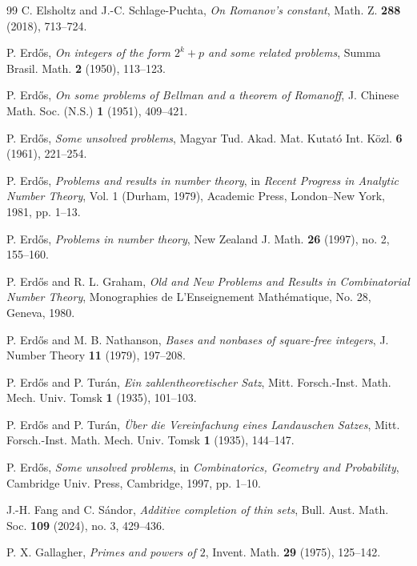 \documentclass[11pt,reqno]{amsart}
\numberwithin{equation}{section}
\begin{document}
\begin{thebibliography}{99}
    C. Elsholtz and J.-C. Schlage-Puchta, \emph{On Romanov's constant}, Math. Z. \textbf{288} (2018), 713--724.

    P. Erd\H{o}s, \emph{On integers of the form $2^k+p$ and some related problems}, Summa Brasil. Math. \textbf{2} (1950), 113--123.

    P. Erd\H{o}s, \emph{On some problems of Bellman and a theorem of Romanoff}, J. Chinese Math. Soc. (N.S.) \textbf{1} (1951), 409--421.

    P. Erd\H{o}s, \emph{Some unsolved problems}, Magyar Tud. Akad. Mat. Kutat\'o Int. K\"ozl. \textbf{6} (1961), 221--254.

    P. Erd\H{o}s, \emph{Problems and results in number theory}, in \emph{Recent Progress in Analytic Number Theory}, Vol. 1 (Durham, 1979), Academic Press, London--New York, 1981, pp. 1--13.

    P. Erd\H{o}s, \emph{Problems in number theory}, New Zealand J. Math. \textbf{26} (1997), no. 2, 155--160.

    P. Erd\H{o}s and R. L. Graham, \emph{Old and New Problems and Results in Combinatorial Number Theory}, Monographies de L'Enseignement Math\'ematique, No. 28, Geneva, 1980.

    P. Erd\H{o}s and M. B. Nathanson, \emph{Bases and nonbases of square-free integers}, J. Number Theory \textbf{11} (1979), 197--208.

    P. Erd\H{o}s and P. Tur\'an, \emph{Ein zahlentheoretischer Satz}, Mitt. Forsch.-Inst. Math. Mech. Univ. Tomsk \textbf{1} (1935), 101--103.

    P. Erd\H{o}s and P. Tur\'an, \emph{\"Uber die Vereinfachung eines Landauschen Satzes}, Mitt. Forsch.-Inst. Math. Mech. Univ. Tomsk \textbf{1} (1935), 144--147.

    P. Erd\H{o}s, \emph{Some unsolved problems}, in \emph{Combinatorics, Geometry and Probability}, Cambridge Univ. Press, Cambridge, 1997, pp. 1--10.

    J.-H. Fang and C. S\'andor, \emph{Additive completion of thin sets}, Bull. Aust. Math. Soc. \textbf{109} (2024), no. 3, 429--436.

    P. X. Gallagher, \emph{Primes and powers of $2$}, Invent. Math. \textbf{29} (1975), 125--142.


\end{thebibliography}
\end{document}
